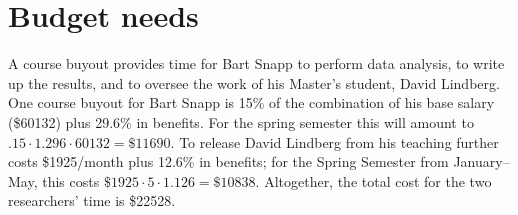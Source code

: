\documentclass[12pt]{article}
\begin{document}
\section{Budget needs}
A course buyout provides time for Bart Snapp to perform data analysis,
to write up the results, and to oversee the work of his Master's
student, David Lindberg.  One course buyout for Bart Snapp is 15\% of
the combination of his base salary (\$60132) plus 29.6\% in
benefits. For the spring semester this will amount to $.15 \cdot
1.296\cdot 60132=\$11690$.  To release David Lindberg from his
teaching further costs \$1925/month plus 12.6\% in benefits; for the
Spring Semester from January--May, this costs $\$1925 \cdot 5 \cdot
1.126 = \$10838$.  Altogether, the total cost for the two researchers'
time is \$22528.

\pagebreak
\printbibliography
\end{document}
